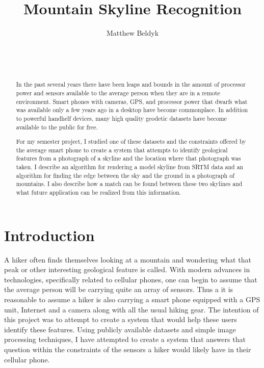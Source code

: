 \documentclass{acm_proc_article-sp}
\begin{document}
\title{Mountain Skyline Recognition}



%
\author{
\alignauthor
Matthew Beldyk\\
       \\
       \\
       \\
}

\maketitle
\begin{abstract}
In the past several years there have been leaps and bounds in the amount of processor power and sensors available to the average person when they are in a remote environment.  Smart phones with cameras, GPS, and processor power that dwarfs what was available only a few years ago in a desktop have become commonplace.  In addition to powerful handhelf devices, many high quality geodetic datasets have become available to the public for free. 

For my semester project, I studied one of these datasets and the constraints offered by the average smart phone to create a system that attempts to identify geological features from a photograph of a skyline and the location where that photograph was taken.  I describe an algorithm for rendering a model skyline from SRTM data and an algorithm for finding the edge between the sky and the ground in a photograph of mountains.  I also describe how a match can be found between these two skylines and what future application can be realized from this information.
\end{abstract}

\section{Introduction}
A hiker often finds themselves looking at a mountain and wondering what that peak or other interesting geological feature is called.  With modern advances in technologies, specifically related to cellular phones, one can begin to assume that the average person will be carrying quite an array of sensors. \cite{burnette2010hello} Thus a it is reasonable to assume a hiker is also carrying a smart phone equipped with a GPS unit, Internet and a camera along with all the usual hiking gear.  The intention of this project was to attempt to create a system that would help these users identify these features. Using publicly available datasets and simple image processing techniques, I have attempted to create a system that answers that question within the constraints of the sensors a hiker would likely have in their cellular phone.  
\end{document}
